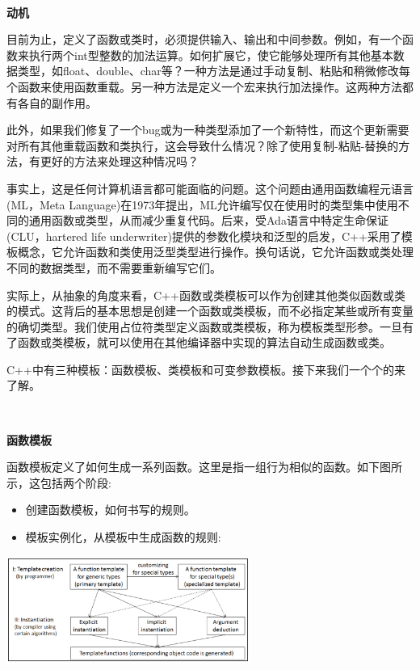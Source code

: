 \noindent\textbf{}\ \par
\textbf{动机} \ \par
目前为止，定义了函数或类时，必须提供输入、输出和中间参数。例如，有一个函数来执行两个int型整数的加法运算。如何扩展它，使它能够处理所有其他基本数据类型，如float、double、char等？一种方法是通过手动复制、粘贴和稍微修改每个函数来使用函数重载。另一种方法是定义一个宏来执行加法操作。这两种方法都有各自的副作用。 \par
此外，如果我们修复了一个bug或为一种类型添加了一个新特性，而这个更新需要对所有其他重载函数和类执行，这会导致什么情况？除了使用复制-粘贴-替换的方法，有更好的方法来处理这种情况吗？ \par
事实上，这是任何计算机语言都可能面临的问题。这个问题由通用函数编程元语言(ML，Meta Language)在1973年提出，ML允许编写仅在使用时的类型集中使用不同的通用函数或类型，从而减少重复代码。后来，受Ada语言中特定生命保证(CLU，hartered life underwriter)提供的参数化模块和泛型的启发，C++采用了模板概念，它允许函数和类使用泛型类型进行操作。换句话说，它允许函数或类处理不同的数据类型，而不需要重新编写它们。 \par
实际上，从抽象的角度来看，C++函数或类模板可以作为创建其他类似函数或类的模式。这背后的基本思想是创建一个函数或类模板，而不必指定某些或所有变量的确切类型。我们使用占位符类型定义函数或类模板，称为模板类型形参。一旦有了函数或类模板，就可以使用在其他编译器中实现的算法自动生成函数或类。 \par
C++中有三种模板：函数模板、类模板和可变参数模板。接下来我们一个个的来了解。 \par

\noindent\textbf{}\ \par
\textbf{函数模板} \ \par
函数模板定义了如何生成一系列函数。这里是指一组行为相似的函数。如下图所示，这包括两个阶段: \par

\begin{itemize}
	\item 创建函数模板，如何书写的规则。
	\item 模板实例化，从模板中生成函数的规则:
\end{itemize}

\begin{center}
	\includegraphics[width=0.6\textwidth]{content/Section-1/Chapter-4/1}
\end{center}

